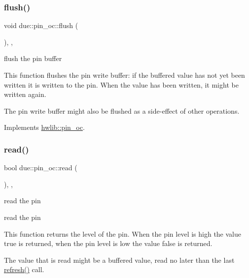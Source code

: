 \subsubsection{\texorpdfstring{flush()}{flush()}}
{\footnotesize\ttfamily void due\+::pin\+\_\+oc\+::flush (\begin{DoxyParamCaption}{ }\end{DoxyParamCaption})\hspace{0.3cm}{\ttfamily [inline]}, {\ttfamily [override]}, {\ttfamily [virtual]}}





flush the pin buffer

This function flushes the pin write buffer\+: if the buffered value has not yet been written it is written to the pin. When the value has been written, it might be written again.

The pin write buffer might also be flushed as a side-\/effect of other operations. 

Implements \hyperlink{classhwlib_1_1pin__oc_a021036a4566c712e43250ddd28a85e54}{hwlib\+::pin\+\_\+oc}.

\mbox{\label{classdue_1_1pin__oc_a2b9121a384b5645253b799e54417c5ca}} 
\subsubsection{\texorpdfstring{read()}{read()}}
{\footnotesize\ttfamily bool due\+::pin\+\_\+oc\+::read (\begin{DoxyParamCaption}{ }\end{DoxyParamCaption})\hspace{0.3cm}{\ttfamily [inline]}, {\ttfamily [override]}, {\ttfamily [virtual]}}





read the pin

read the pin

This function returns the level of the pin. When the pin level is high the value true is returned, when the pin level is low the value false is returned.

The value that is read might be a buffered value, read no later than the last \hyperlink{classdue_1_1pin__oc_a9cda433d0079aee45a282f07efe2fee3}{refresh()} call.

